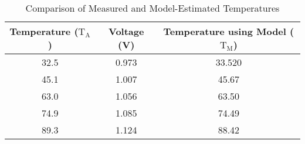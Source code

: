 \documentclass[11pt, a4paper]{article}
\begin{document}
\begin{table}[htbp]
  \centering
  \caption*{Comparison of Measured and Model-Estimated Temperatures}
  \label{tab:temp_comparison}
  \begin{tabular}{ccc}
    \toprule
    \textbf{Temperature ($\text{T}_{\text{A}}$)} & \textbf{Voltage (V)} & \textbf{Temperature using Model ($\text{T}_{\text{M}}$)} \\
    \midrule
    32.5 & 0.973 & 33.520 \\
    45.1 & 1.007 & 45.67 \\
    63.0 & 1.056 & 63.50 \\
    74.9 & 1.085 & 74.49 \\
    89.3 & 1.124 & 88.42 \\
    \bottomrule
  \end{tabular}
\end{table}
\end{document}
